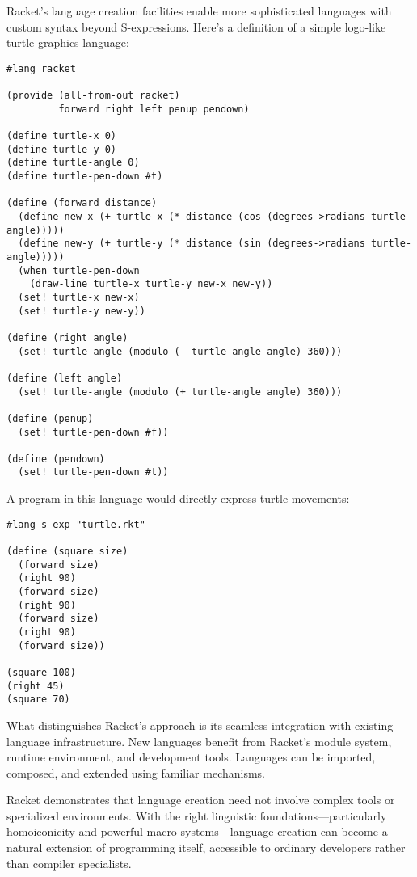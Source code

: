 \documentclass[11pt]{article}
\begin{document}
Racket's language creation facilities enable more sophisticated languages with custom syntax beyond S-expressions. Here's a definition of a simple logo-like turtle graphics language:

\begin{verbatim}
#lang racket

(provide (all-from-out racket)
         forward right left penup pendown)

(define turtle-x 0)
(define turtle-y 0)
(define turtle-angle 0)
(define turtle-pen-down #t)

(define (forward distance)
  (define new-x (+ turtle-x (* distance (cos (degrees->radians turtle-angle)))))
  (define new-y (+ turtle-y (* distance (sin (degrees->radians turtle-angle)))))
  (when turtle-pen-down
    (draw-line turtle-x turtle-y new-x new-y))
  (set! turtle-x new-x)
  (set! turtle-y new-y))

(define (right angle)
  (set! turtle-angle (modulo (- turtle-angle angle) 360)))

(define (left angle)
  (set! turtle-angle (modulo (+ turtle-angle angle) 360)))

(define (penup)
  (set! turtle-pen-down #f))

(define (pendown)
  (set! turtle-pen-down #t))
\end{verbatim}

A program in this language would directly express turtle movements:

\begin{verbatim}
#lang s-exp "turtle.rkt"

(define (square size)
  (forward size)
  (right 90)
  (forward size)
  (right 90)
  (forward size)
  (right 90)
  (forward size))

(square 100)
(right 45)
(square 70)
\end{verbatim}

What distinguishes Racket's approach is its seamless integration with existing language infrastructure. New languages benefit from Racket's module system, runtime environment, and development tools. Languages can be imported, composed, and extended using familiar mechanisms.

Racket demonstrates that language creation need not involve complex tools or specialized environments. With the right linguistic foundations—particularly homoiconicity and powerful macro systems—language creation can become a natural extension of programming itself, accessible to ordinary developers rather than compiler specialists.
\end{document}
